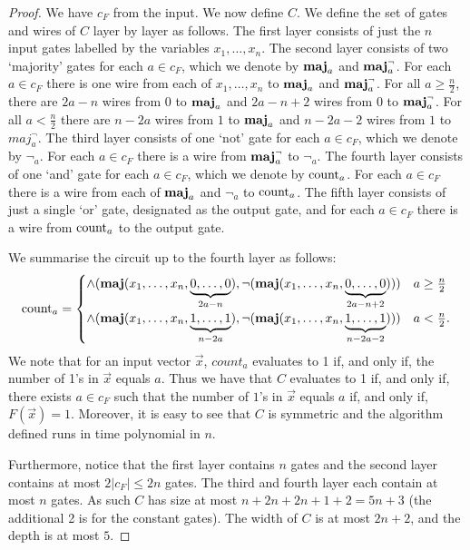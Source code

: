 \documentclass[../paper.tex]{subfiles}
\begin{document}
\begin{proof}
  We have $c_{F}$ from the input. We now define $C$. We define the set of gates
  and wires of $C$ layer by layer as follows. The first layer consists of just
  the $n$ input gates labelled by the variables $x_1, \ldots , x_n$. The second
  layer consists of two `majority' gates for each $a \in c_{F}$, which we denote
  by $\text{\textbf{maj}}_a$ and $\text{\textbf{maj}}^{\neg}_a$. For each $a \in c_{F}$ there is one wire from
  each of $x_1, \ldots , x_n$ to $\text{\textbf{maj}}_a$ and $\text{\textbf{maj}}^{\neg}_a$. For all $a \geq
  \frac{n}{2}$, there are $2a - n$ wires from $0$ to $\text{\textbf{maj}}_a$ and $2a - n + 2$
  wires from $0$ to $\text{\textbf{maj}}^{\neg}_a$. For all $a < \frac{n}{2}$ there are $n -
  2a$ wires from $1$ to $\text{\textbf{maj}}_a$ and $n - 2a - 2$ wires from $1$ to
  $maj^{\neg}_a$. The third layer consists of one `not' gate for each $a \in
  c_{F}$, which we denote by $\neg_a$. For each $a \in c_{F}$ there is a wire
  from $\text{\textbf{maj}}^\neg_a$ to $\neg_a$. The fourth layer consists of one `and' gate
  for each $a \in c_{F}$, which we denote by $\text{count}_a$. For each $a \in
  c_{F}$ there is a wire from each of $\text{\textbf{maj}}_a$ and $\neg_a$ to $\text{count}_a$.
  The fifth layer consists of just a single `or' gate, designated as the output
  gate, and for each $a \in c_{F}$ there is a wire from $\text{count}_a$ to the
  output gate.

  We summarise the circuit up to the fourth layer as follows:
  \[
    \text{count}_a = \begin{cases} \land ( \text{\textbf{maj}} ( x_1, \ldots, x_n, \underbrace
      {0, \ldots, 0}_{2a - n} ), \neg ( \text{\textbf{maj}} (x_1, \ldots , x_n, \underbrace{0,
        \ldots,
        0}_{2a - n + 2} ) )) &  a \geq \frac{n}{2} \\
      \land ( \text{\textbf{maj}} ( x_1, \ldots, x_n, \underbrace {1, \ldots, 1}_{n - 2a} ),
      \neg ( \text{\textbf{maj}} ( x_1, \ldots , x_n, \underbrace{1, \ldots, 1}_{n - 2a -2} )
      )) & a < \frac{n}{2}.
    \end{cases}
  \]
  We note that for an input vector $\vec{x}$, $count_a$ evaluates to 1 if, and
  only if, the number of 1's in $\vec{x}$ equals $a$. Thus we have that $C$
  evaluates to 1 if, and only if, there exists $a \in c_{F}$ such that the
  number of $1$'s in $\vec{x}$ equals $a$ if, and only if, $F (\vec{x}) = 1$.
  Moreover, it is easy to see that $C$ is symmetric and the algorithm defined
  runs in time polynomial in $n$.

  Furthermore, notice that the first layer contains $n$ gates and the second
  layer contains at most $2 \vert c_{F} \vert \leq 2n$ gates. The third and
  fourth layer each contain at most $n$ gates. As such $C$ has size at most $n +
  2n + 2n + 1 + 2 = 5n +3$ (the additional 2 is for the constant gates). The
  width of $C$ is at most $2n + 2$, and the depth is at most $5$.
\end{proof}
\end{document}
